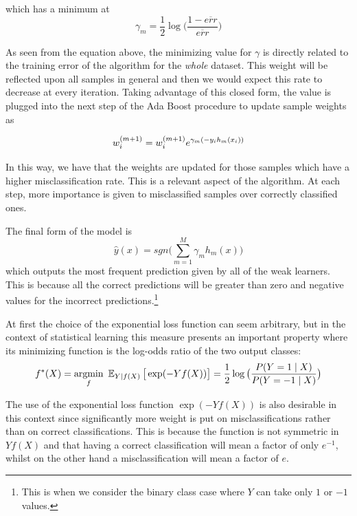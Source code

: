 which has a minimum at
\begin{equation}
\gamma_{m} = \frac{1}{2} \log\big( \frac{1 - \overline{err} }{ \overline{err} } \big)
\end{equation}

As seen from the equation above, the minimizing value for $\gamma$ is directly related to the training error of the algorithm for the \textit{whole} dataset. This weight will be reflected upon all samples in general and then we would expect this rate to decrease at every iteration. Taking advantage of this closed form, the value is plugged into the next step of the Ada Boost procedure to update sample weights as

\begin{equation}
w_i^{(m+1)} =  w_i^{(m+1)} e^{\gamma_m(-y_i h_m(x_i))} \\
\end{equation}

In this way, we have that the weights are updated for those samples which have a higher misclassification rate. This is a relevant aspect of the algorithm. At each step, more importance is given to misclassified samples over correctly classified ones.



The final form of the model is
\begin{equation}
 \hat{y}(x) = sgn\big( \sum_{m=1}^{M} \gamma_m h_m(x) \big)
\end{equation}
  which outputs the most frequent prediction given by all of the weak learners. This is because all the correct predictions will be greater than zero and negative values for the incorrect predictions.\footnote{This is when we consider the binary class case where $Y$ can take only $1$ or $-1$ values.}

At first the choice of the exponential loss function can seem arbitrary, but in the context of statistical learning this measure presents an important property where its minimizing function is the log-odds ratio of the two output classes:
\begin{equation}
f^*(X) = \underset{f}{\mathrm{argmin}} \ \Expect_{Y | f(X)}\big[ \exp(-Yf(X)) \big] = \frac{1}{2}\log\big( \frac{ P(Y=1 \mid X) }{ P(Y=-1 \mid X) } \big)
\end{equation}


The use of the exponential loss function $\exp(-Yf(X))$ is also desirable in this context since significantly more weight is put on misclassifications rather than on correct classifications. This is because the function is not symmetric in $Yf(X)$ and that having a correct classification will mean a factor of only $e^{-1}$, whilst on the other hand a misclassification will mean a factor of $e$.

